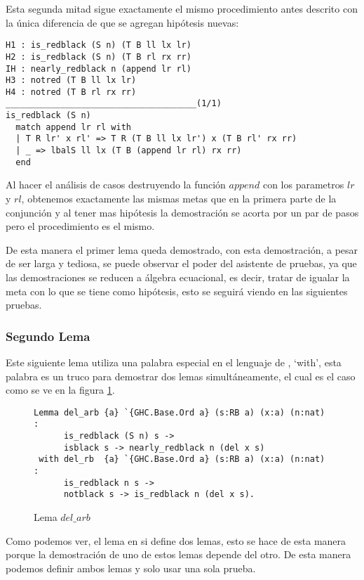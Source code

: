 Esta segunda mitad sigue exactamente el mismo procedimiento antes descrito con la \'unica
diferencia de que se agregan hip\'otesis nuevas:

\begin{verbatim}
H1 : is_redblack (S n) (T B ll lx lr)
H2 : is_redblack (S n) (T B rl rx rr)
IH : nearly_redblack n (append lr rl)
H3 : notred (T B ll lx lr)
H4 : notred (T B rl rx rr)
______________________________________(1/1)
is_redblack (S n)
  match append lr rl with
  | T R lr' x rl' => T R (T B ll lx lr') x (T B rl' rx rr)
  | _ => lbalS ll lx (T B (append lr rl) rx rr)
  end
\end{verbatim}

Al hacer el análisis de casos destruyendo la funci\'on $append$ con los parametros $lr$ y $rl$,
obtenemos exactamente las mismas metas que en la primera parte de la conjunci\'on y al tener mas
hipótesis la demostraci\'on se acorta por un par de pasos pero el procedimiento es el mismo.

De esta manera el primer lema queda demostrado, con esta demostraci\'on, a pesar de ser larga y
tediosa, se puede observar el poder del asistente de pruebas, ya que las demostraciones se reducen
a álgebra ecuacional, es decir, tratar de igualar la meta con lo que se tiene como hip\'otesis,
esto se seguirá viendo en las siguientes pruebas.

\subsubsection{Segundo Lema}
Este siguiente lema utiliza una palabra especial en el lenguaje de {\coq}, `with', esta palabra
es un truco para demostrar dos lemas simultáneamente, el cual es el caso como se ve en la figura
\ref{lema_6}.

\begin{figure}[!ht]
\centering
\captionsetup{justification=centering}
\begin{verbatim}
Lemma del_arb {a} `{GHC.Base.Ord a} (s:RB a) (x:a) (n:nat) :
      is_redblack (S n) s ->
      isblack s -> nearly_redblack n (del x s)
 with del_rb  {a} `{GHC.Base.Ord a} (s:RB a) (x:a) (n:nat) :
      is_redblack n s ->
      notblack s -> is_redblack n (del x s).
\end{verbatim}
\caption{Lema $del\_arb$}
\label{lema_6}
\end{figure}



Como podemos ver, el lema en si define dos lemas, esto se hace de esta manera porque la
demostraci\'on de uno de estos lemas depende del otro. De esta manera podemos definir ambos lemas y
solo usar una sola prueba.

